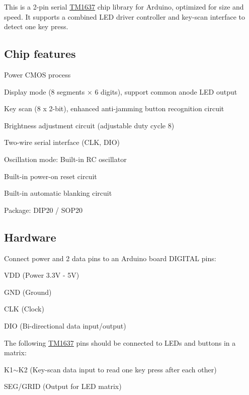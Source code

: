 \href{https://travis-ci.org/Erriez/ErriezTM1637}{\tt }

This is a 2-\/pin serial \hyperlink{class_t_m1637}{T\+M1637} chip library for Arduino, optimized for size and speed. It supports a combined L\+ED driver controller and key-\/scan interface to detect one key press.



\subsection*{Chip features}


\begin{DoxyItemize}
\item Power C\+M\+OS process
\item Display mode (8 segments × 6 digits), support common anode L\+ED output
\item Key scan (8 x 2-\/bit), enhanced anti-\/jamming button recognition circuit
\item Brightness adjustment circuit (adjustable duty cycle 8)
\item Two-\/wire serial interface (C\+LK, D\+IO)
\item Oscillation mode\+: Built-\/in RC oscillator
\item Built-\/in power-\/on reset circuit
\item Built-\/in automatic blanking circuit
\item Package\+: D\+I\+P20 / S\+O\+P20
\end{DoxyItemize}

\subsection*{Hardware}

Connect power and 2 data pins to an Arduino board D\+I\+G\+I\+T\+AL pins\+:
\begin{DoxyItemize}
\item V\+DD (Power 3.\+3V -\/ 5V)
\item G\+ND (Ground)
\item C\+LK (Clock)
\item D\+IO (Bi-\/directional data input/output)
\end{DoxyItemize}

The following \hyperlink{class_t_m1637}{T\+M1637} pins should be connected to L\+ED\textquotesingle{}s and buttons in a matrix\+:
\begin{DoxyItemize}
\item K1$\sim$\+K2 (Key-\/scan data input to read one key press after each other)
\item S\+E\+G/\+G\+R\+ID (Output for L\+ED matrix)
\end{DoxyItemize}

